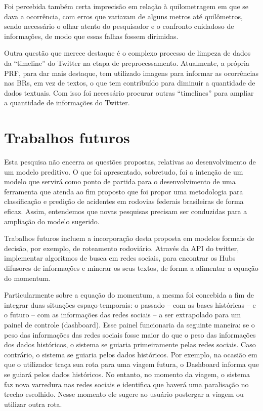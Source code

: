 Foi percebida também certa imprecisão em relação à quilometragem em que se dava a ocorrência, com erros que variavam de alguns metros até quilômetros, sendo necessário o olhar atento do pesquisador e o confronto cuidadoso de informações, de modo que essas falhas fossem dirimidas.

Outra questão que merece destaque é o complexo processo de limpeza de dados da ``timeline'' do Twitter na etapa de preprocessamento. Atualmente, a própria PRF, para dar mais destaque, tem utilizado imagens para informar as ocorrências nas BRs, em vez de textos, o que tem contribuído para diminuir a quantidade de dados textuais. Com isso foi necessário procurar outras ``timelines'' para ampliar a quantidade de informações do Twitter.


\section{Trabalhos futuros}

Esta pesquisa não encerra as questões propostas, relativas ao desenvolvimento de um modelo preditivo. O que foi apresentado, sobretudo, foi a intenção de um modelo que servirá como ponto de partida para o desenvolvimento de uma ferramenta que atenda ao fim proposto que foi propor uma metodologia para classificação e predição de acidentes em rodovias federais brasileiras de forma eficaz. Assim, entendemos que novas pesquisas precisam ser conduzidas para a ampliação do modelo sugerido. 

Trabalhos futuros incluem a incorporação desta proposta em modelos formais de decisão, por exemplo, de roteamento
rodoviário. Através da API do twitter, implementar algoritmos de busca em redes sociais, para encontrar os Hubs difusores de informações e minerar os seus textos, de forma a alimentar a equação do momentum.

Particularmente sobre a equação do momentum, a mesma foi concebida a fim de integrar duas situações espaço-temporais: o passado -- com as bases históricas -- e o futuro -- com as informações das redes sociais -- a ser extrapolado para um painel de controle (dashboard). Esse painel funcionaria da seguinte maneira: se o peso das informações das redes sociais fosse maior do que o peso das informações dos dados históricos, o sistema se guiaria primeiramente pelas redes sociais. Caso contrário, o sistema se guiaria pelos dados históricos. Por exemplo, na ocasião em que o utilizador traça sua rota para uma viagem futura, o Dashboard informa que se guiará pelos dados históricos. No entanto, no momento da viagem, o sistema faz nova varredura nas redes sociais e identifica que haverá uma paralisação no trecho escolhido. Nesse momento ele sugere ao usuário postergar a viagem ou utilizar outra rota. 

